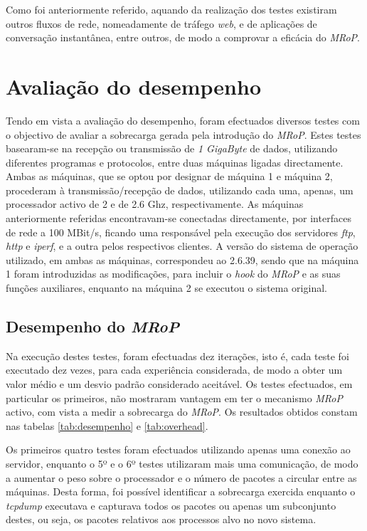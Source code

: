 Como foi anteriormente referido, aquando da realização dos testes existiram outros fluxos de rede, nomeadamente de tráfego \textit{web}, e de aplicações de conversação instantânea, entre outros, de modo a comprovar a eficácia do \textit{MRoP}.

\section{Avaliação do desempenho}
\label{sec:eval_performance}

Tendo em vista a avaliação do desempenho, foram efectuados diversos testes com o objectivo de avaliar a sobrecarga gerada pela introdução do \textit{MRoP}.
Estes testes basearam-se na recepção ou transmissão de \textit{1 GigaByte} de dados, utilizando diferentes programas e protocolos, entre duas máquinas ligadas directamente.
Ambas as máquinas, que se optou por designar de máquina 1 e máquina 2, procederam à transmissão/recepção de dados, utilizando cada uma, apenas, um processador activo de 2 e de 2.6 Ghz, respectivamente.
As máquinas anteriormente referidas encontravam-se conectadas directamente, por interfaces de rede a 100 MBit/s, ficando uma responsável pela execução dos servidores \textit{ftp}, \textit{http} e \textit{iperf}, e a outra pelos respectivos clientes.
A versão do sistema de operação utilizado, em ambas as máquinas, correspondeu ao 2.6.39, sendo que na máquina 1 foram introduzidas as modificações, para incluir o \textit{hook} do \textit{MRoP} e as suas funções auxiliares, enquanto na máquina 2 se executou o sistema original.

\subsection{Desempenho do \textit{MRoP}}


Na execução destes testes, foram efectuadas dez iterações, isto é, cada teste foi executado dez vezes, para cada experiência considerada, de modo a obter um valor médio e um desvio padrão considerado aceitável.
Os testes efectuados, em particular os primeiros, não mostraram vantagem em ter o mecanismo \textit{MRoP} activo, com vista a medir a sobrecarga do \textit{MRoP}.
Os resultados obtidos constam nas tabelas \ref{tab:desempenho} e \ref{tab:overhead}.

Os primeiros quatro testes foram efectuados utilizando apenas uma conexão ao servidor, enquanto o 5º e o 6º testes utilizaram mais uma comunicação, de modo a aumentar o peso sobre o processador e o número de pacotes a circular entre as máquinas.
Desta forma, foi possível identificar a sobrecarga exercida enquanto o \textit{tcpdump} executava e capturava todos os pacotes ou apenas um subconjunto destes, ou seja, os pacotes relativos aos processos alvo no novo sistema.

